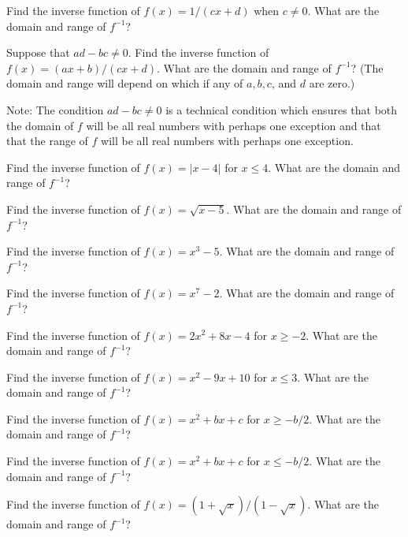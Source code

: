 \begin{theorem}
\begin{theorem}
\begin{theorem}
\begin{theorem}
\begin{theorem}
\begin{exercises}
\begin{exercise}
\begin{exercise}
\begin{exercise}
\begin{exercise}
\begin{exercise}
\begin{exercise}
\begin{exercise}
\begin{exercise}
\begin{exercise} Find the inverse function of $f(x) = 1/(cx+d)$
when $c\neq 0$. What are the domain and range of $f^{-1}$?

\begin{exercise} Suppose that $ad-bc \neq 0$. Find the inverse function
of $f(x) = (ax+b)/(cx+d)$. What are the domain and range of
$f^{-1}$? (The domain and range will depend on which if any of
$a,b,c$, and $d$ are zero.)

\item{}
Note: The condition $ad-bc \neq 0 $ is a technical condition which
ensures that both the domain of $f$  will be all real numbers with
perhaps one exception and that that the range of $f$ will be all
real numbers with perhaps one exception.

\begin{exercise} Find the inverse function of $f(x) =|x-4|$ for
$x\leq4$. What are the domain and range of $f^{-1}$?

\begin{exercise} Find the inverse function of $f(x) = \sqrt{x-5}$. 
What are the domain and range of $f^{-1}$?

\begin{exercise} Find the inverse function of $f(x) = x^3 - 5$.  What are the
domain and range of $f^{-1}$?

\begin{exercise} Find the inverse function of $f(x) =x^7 - 2$. What are the
domain and range of $f^{-1}$?

\begin{exercise} Find the inverse function of $f(x) =2x^2 +8x - 4 $ for
$x\geq -2 $. What are the domain and range of $f^{-1 } $? 

\begin{exercise} Find the inverse function of $f(x) =x^2 -9x + 10 $ for
$x\leq 3 $.  What are the domain and range of $f^{-1 } $?  

\begin{exercise} Find the inverse function of $f(x)= x^2 +bx+ c$ for $x\geq
-b/2$. What are the domain and range of $f^{-1 } $?

\begin{exercise} Find the inverse function of $f(x)= x^2 +bx+ c$ for
$x\leq -b/2$. What are the domain and range of $f^{-1}$?

\begin{exercise} Find the inverse function of $f(x) =
(1+\sqrt{x})/(1-\sqrt{x})$. What are the domain and range of $f^{-1 }$?


\end{exercise}
\end{exercise}
\end{exercise}
\end{exercise}
\end{exercise}
\end{exercise}
\end{exercise}
\end{exercise}
\end{exercise}
\end{exercise}
\end{exercise}
\end{exercise}
\end{exercise}
\end{exercise}
\end{exercise}
\end{exercise}
\end{exercise}
\end{exercise}
\end{exercise}
\end{exercises}
\end{theorem}
\end{theorem}
\end{theorem}
\end{theorem}
\end{theorem}
